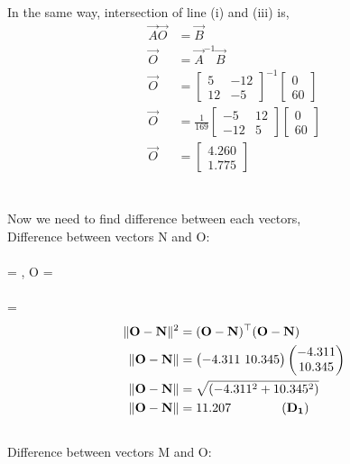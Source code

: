\documentclass[journal,12pt,twocolumn]{IEEEtran}
\begin{document}
In the same way, intersection of line (i) and (iii) is,
\begin{align*}
\vec{A}\vec{O} &=\vec{B} \\
\vec{O} &= \vec{A}^{-1}\vec{B} \\
\vec{O}
& =
\begin{bmatrix}
5 & -12 \\
12 & -5 
\end{bmatrix}^{-1}
\begin{bmatrix}
0 \\ 60
\end{bmatrix}  \\[6pt]
\vec{O}
& =
\frac{1}{169}
\begin{bmatrix}
-5 & 12 \\
-12 & 5 
\end{bmatrix}
\begin{bmatrix}
0 \\ 60
\end{bmatrix} \\[6pt]
\vec{O}
&=
\begin{bmatrix}
4.260 \\ 1.775
\end{bmatrix}
\end{align*}\\ \\
Now we need to find difference between each vectors,\\
Difference between vectors N and O:\\ \\
 = , O = \\ \\
 = \\
\begin{align*}
\lVert\mathbf{O}-\mathbf{N}\rVert^2 &= (\mathbf{O}-\mathbf{N})^\top (\mathbf{O}-\mathbf{N})\\ \nonumber
\lVert\mathbf{O}-\mathbf{N}\rVert&=\begin{pmatrix}-4.311 \ 10.345\end{pmatrix} \begin{pmatrix}-4.311\\10.345\end{pmatrix}\\ \nonumber
\lVert\mathbf{O}-\mathbf{N}\rVert&=\sqrt{(-4.311^2 + 10.345^2)}\\ \nonumber
\lVert\mathbf{O}-\mathbf{N}\rVert&=11.207 \qquad\qquad (\mathbf{D_1})\\ \nonumber
\end{align*}
Difference between vectors M and O:\\ \\
\end{document}
